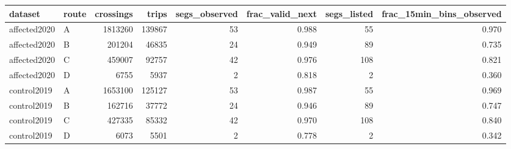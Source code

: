 \begin{tabular}{llrrrrrr}
\toprule
dataset & route & crossings & trips & segs_observed & frac_valid_next & segs_listed & frac_15min_bins_observed \\
\midrule
affected2020 & A & 1813260 & 139867 & 53 & 0.988 & 55 & 0.970 \\
affected2020 & B & 201204 & 46835 & 24 & 0.949 & 89 & 0.735 \\
affected2020 & C & 459007 & 92757 & 42 & 0.976 & 108 & 0.821 \\
affected2020 & D & 6755 & 5937 & 2 & 0.818 & 2 & 0.360 \\
control2019 & A & 1653100 & 125127 & 53 & 0.987 & 55 & 0.969 \\
control2019 & B & 162716 & 37772 & 24 & 0.946 & 89 & 0.747 \\
control2019 & C & 427335 & 85332 & 42 & 0.970 & 108 & 0.840 \\
control2019 & D & 6073 & 5501 & 2 & 0.778 & 2 & 0.342 \\
\bottomrule
\end{tabular}
